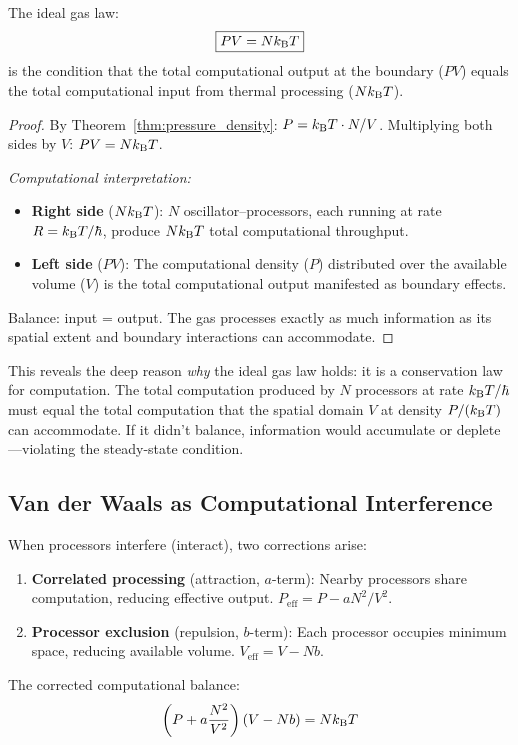 \begin{theorem}
\label{thm:gas_computation}
The ideal gas law:
\begin{equation}
\boxed{PV = Nk_{\mathrm{B}} T}
\end{equation}
is the condition that the total computational output at the boundary ($PV$) equals the total computational input from thermal processing ($Nk_{\mathrm{B}} T$).
\end{theorem}

\begin{proof}
By Theorem~\ref{thm:pressure_density}: $P = k_{\mathrm{B}} T \cdot N/V$. Multiplying both sides by $V$: $PV = Nk_{\mathrm{B}} T$.

\emph{Computational interpretation:}
\begin{itemize}
    \item \textbf{Right side} ($Nk_{\mathrm{B}} T$): $N$ oscillator--processors, each running at rate $R = k_{\mathrm{B}} T/\hbar$, produce $Nk_{\mathrm{B}} T$ total computational throughput.
    \item \textbf{Left side} ($PV$): The computational density ($P$) distributed over the available volume ($V$) is the total computational output manifested as boundary effects.
\end{itemize}
Balance: input = output. The gas processes exactly as much information as its spatial extent and boundary interactions can accommodate.
\end{proof}

\begin{remark}
This reveals the deep reason \emph{why} the ideal gas law holds: it is a conservation law for computation. The total computation produced by $N$ processors at rate $k_{\mathrm{B}} T/\hbar$ must equal the total computation that the spatial domain $V$ at density $P/(k_{\mathrm{B}} T)$ can accommodate. If it didn't balance, information would accumulate or deplete---violating the steady-state condition.
\end{remark}

\subsection{Van der Waals as Computational Interference}

\begin{proposition}
\label{prop:vdw}
When processors interfere (interact), two corrections arise:
\begin{enumerate}
    \item \textbf{Correlated processing} (attraction, $a$-term): Nearby processors share computation, reducing effective output. $P_{\mathrm{eff}} = P - aN^2/V^2$.
    \item \textbf{Processor exclusion} (repulsion, $b$-term): Each processor occupies minimum space, reducing available volume. $V_{\mathrm{eff}} = V - Nb$.
\end{enumerate}
The corrected computational balance:
\begin{equation}
    \left(P + a\frac{N^2}{V^2}\right)(V - Nb) = Nk_{\mathrm{B}} T
\end{equation}
\end{proposition}

